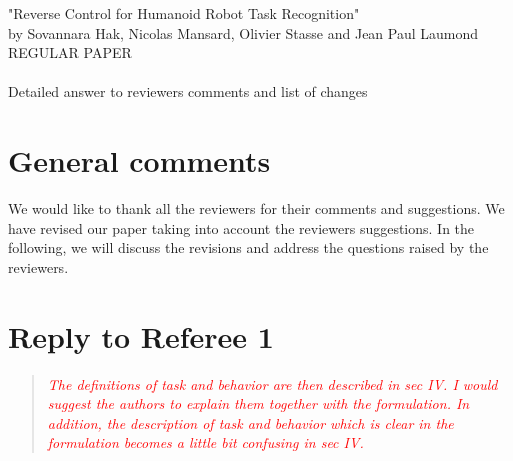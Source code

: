 \documentclass[11pt]{article}
\newcommand{\red}[1]{{\textcolor{red}{#1}}}
\begin{document}
\begin{center}
  {\large "Reverse Control for Humanoid Robot Task Recognition" \\
  \small by Sovannara Hak, Nicolas Mansard, Olivier Stasse and Jean Paul Laumond\\
  \small REGULAR PAPER \\
  ~ \\
  \large Detailed answer to reviewers comments and list of changes\\}
\end{center}


\section{General comments}
We would like to thank all the reviewers for their comments and suggestions.
We have revised	our paper taking into account the reviewers suggestions.
In the following, we will discuss the revisions and address the questions raised by the reviewers.


\section{Reply to Referee 1}
\begin{quote}
\textit{
  \red{The definitions of task and behavior are then described in sec IV.  I would suggest the authors to explain them together with the formulation.  In addition, the description of task and behavior which is clear in the formulation becomes a little bit confusing in sec IV.}
}
\end{quote}
\end{document}
